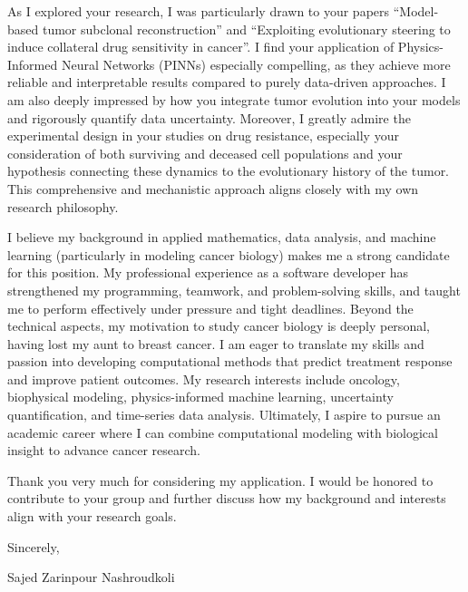 As I explored your research, I was particularly drawn to your papers “Model-based tumor subclonal reconstruction” and 
“Exploiting evolutionary steering to induce collateral drug sensitivity in cancer”. 
I find your application of Physics-Informed Neural Networks (PINNs) especially compelling, 
as they achieve more reliable and interpretable results compared to purely data-driven approaches. 
I am also deeply impressed by how you integrate tumor evolution into your models and rigorously quantify data uncertainty. 
Moreover, I greatly admire the experimental design in your studies on drug resistance,
especially your consideration of both surviving and deceased cell populations and your hypothesis connecting these dynamics to the evolutionary history of the tumor. 
This comprehensive and mechanistic approach aligns closely with my own research philosophy.

I believe my background in applied mathematics, data analysis, and machine learning (particularly in modeling cancer biology) makes me a strong candidate for this position. 
My professional experience as a software developer has strengthened my programming, teamwork, and problem-solving skills, and 
taught me to perform effectively under pressure and tight deadlines. 
Beyond the technical aspects, my motivation to study cancer biology is deeply personal, having lost my aunt to breast cancer. 
I am eager to translate my skills and passion into developing computational methods that predict treatment response and improve patient outcomes. 
My research interests include oncology, biophysical modeling, physics-informed machine learning, uncertainty quantification, and time-series data analysis. 
Ultimately, I aspire to pursue an academic career where I can combine computational modeling with biological insight to advance cancer research.

Thank you very much for considering my application. I would be honored to contribute to your group and further discuss how my background and interests align with your research goals.

Sincerely,

\vspace{1em}
Sajed Zarinpour Nashroudkoli

\clearpage
